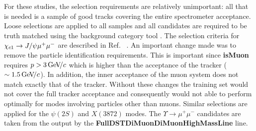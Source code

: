For these studies, the selection requirements are relatively
unimportant: all that is needed is a sample of good tracks covering
the entire spectrometer acceptance.  Loose selections are applied to all samples and all candidates are
required to be truth matched using the background category tool
\cite{Gligorov:1035682}. The selection criteria for ${\chi_{{c} 1}} \rightarrow
J/\psi \mu^+ \mu^-$ are described in
Ref. ~\cite{Anderlini:2270922}. An important change made was to remove the
particle identification requirements.  This is important since
\textbf{isMuon} requires $p > 3 \text{\,Ge\kern -0.1em V\!/}c$ which is higher than the
acceptance of the tracker ($\sim 1.5 \text{\,Ge\kern -0.1em V\!/}c$). In addition, the inner
acceptance of the muon system does not match exactly that of the
tracker. Without these changes the training set would not cover the
full tracker acceptance and consequently would not able to perform optimally for
modes involving particles other than muons.  Similar selections are applied for the $\psi(2S)$ and
$X(3872)$ modes. The $\Upsilon \rightarrow \mu^+ \mu^-$ candidates are
taken from the output by the \textbf{FullDSTDiMuonDiMuonHighMassLine} line.
